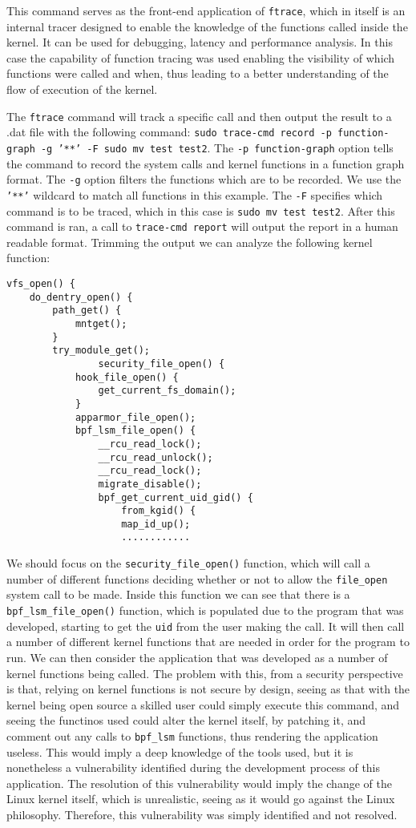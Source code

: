 This command serves as the front-end application of \texttt{ftrace}, which in itself is an internal tracer designed to enable the knowledge of the functions called inside the kernel. It can be used for debugging, latency and performance analysis. In this case the capability of function tracing was used enabling the visibility of which functions were called and when, thus leading to a better understanding of the flow of execution of the kernel.

The \texttt{ftrace} command will track a specific call and then output the result to a .dat file with the following command: \texttt{sudo trace-cmd record -p function-graph -g '**' -F sudo mv test test2}.
The \texttt{-p function-graph} option tells the command to record the system calls and kernel functions in a function graph format.
The \texttt{-g} option filters the functions which are to be recorded. We use the \texttt{'**'} wildcard to match all functions in this example.
The \texttt{-F} specifies which command is to be traced, which in this case is \texttt{sudo mv test test2}.
After this command is ran, a call to \texttt{trace-cmd report} will output the report in a human readable format.
Trimming the output we can analyze the following kernel function:

\begin{lstlisting}
vfs_open() {
	do_dentry_open() {
		path_get() {
			mntget();
		}
		try_module_get();
                security_file_open() {
			hook_file_open() {
				get_current_fs_domain();
			}
			apparmor_file_open();
			bpf_lsm_file_open() {
				__rcu_read_lock();
				__rcu_read_unlock();
				__rcu_read_lock();
				migrate_disable();
				bpf_get_current_uid_gid() {
					from_kgid() {
					map_id_up();
					............
\end{lstlisting}

We should focus on the \texttt{security\_file\_open()} function, which will call a number of different functions deciding whether or not to allow the \texttt{file\_open} system call to be made.
Inside this function we can see that there is a \texttt{bpf\_lsm\_file\_open()} function, which is populated due to the program that was developed, starting to get the \texttt{uid} from the user making the call.
It will then call a number of different kernel functions that are needed in order for the program to run.
We can then consider the application that was developed as a number of kernel functions being called. The problem with this, from a security perspective is that, relying on kernel functions is not secure by design, seeing as that with the kernel being open source a skilled user could simply execute this command, and seeing the functinos used could alter the kernel itself, by patching it, and comment out any calls to \texttt{bpf\_lsm} functions, thus rendering the application useless. This would imply a deep knowledge of the tools used, but it is nonetheless a vulnerability identified during the development process of this application.
The resolution of this vulnerability would imply the change of the Linux kernel itself, which is unrealistic, seeing as it would go against the Linux philosophy. Therefore, this vulnerability was simply identified and not resolved.

